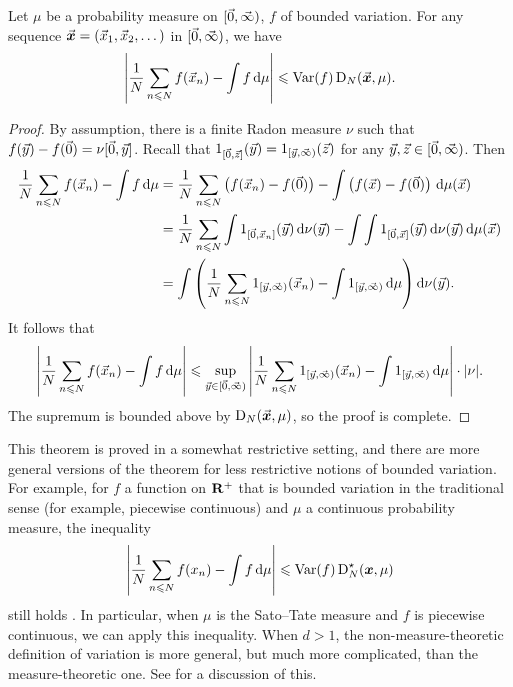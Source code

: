 \begin{theorem}\label{thm:koksma-hlawka}
Let $\mu$ be a probability measure on $[\vec{0},\vec{\infty})$, $f$ of bounded 
variation. For any sequence $\vec{\boldsymbol x} = (\vec{x}_1,\vec{x}_2,\dots)$ in $[\vec{0},\vec{\infty})$, 
we have 
\[
	\left| \frac{1}{N} \sum_{n\leqslant N} f(\vec{x}_n) - \int f\, \mathrm{d}\mu \right| \leqslant \operatorname{Var}(f) \operatorname{D}_N(\vec{\boldsymbol x},\mu) .
\]
\end{theorem}
\begin{proof}
By assumption, there is a finite Radon measure $\nu$ 
such that $f(\vec{y}) - f(\vec{0}) = \nu[\vec{0},\vec{y}]$. Recall that 
$1_{[\vec{0},\vec{z}]}(\vec{y}) = 1_{[\vec{y},\vec{\infty})}(\vec{z})$ for any 
$\vec{y},\vec{z}\in [\vec{0},\vec{\infty})$. Then 
\begin{align*}
	\frac{1}{N} \sum_{n\leqslant N} f(\vec{x}_n) - \int f\, \mathrm{d}\mu 
		&= \frac{1}{N} \sum_{n\leqslant N} \left(f(\vec{x}_n) - f(\vec{0})\right) - \int \left(f(\vec{x}) - f(\vec{0})\right)\, \mathrm{d}\mu(\vec{x}) \\
		&= \frac{1}{N} \sum_{n\leqslant N} \int 1_{[\vec{0},\vec{x}_n]}(\vec{y})\, \mathrm{d} \nu(\vec{y}) - \int \int 1_{[\vec{0},\vec{x}]}(\vec{y})\, \mathrm{d}\nu(\vec{y}) \, \mathrm{d}\mu(\vec{x}) \\
		&= \int \left(\frac{1}{N} \sum_{n\leqslant N} 1_{[\vec{y},\vec{\infty})}(\vec{x}_n) - \int 1_{[\vec{y},\vec{\infty})}\, \mathrm{d}\mu \right) \mathrm{d}\nu(\vec{y}) .
\end{align*}
It follows that 
\[
	\left| \frac{1}{N} \sum_{n\leqslant N} f(\vec{x}_n) - \int f\, \mathrm{d}\mu \right|
		\leqslant \sup_{\vec{y}\in [\vec{0},\vec{\infty})} \left| \frac{1}{N} \sum_{n\leqslant N} 1_{[\vec{y},\vec{\infty})}(\vec{x}_n) - \int 1_{[\vec{y},\vec{\infty})}\, \mathrm{d}\mu\right| \cdot |\nu| .
\]
The supremum is bounded above by $\operatorname{D}_N(\vec{\boldsymbol x},\mu)$, so the proof is complete. 
\end{proof}

This theorem is proved in a somewhat restrictive setting, and there are more 
general versions of the theorem for less restrictive notions of bounded 
variation. For example, for $f$ a function on $\mathbf{R}^+$ that is bounded variation 
in the traditional sense (for example, piecewise continuous) and $\mu$ a 
continuous probability measure, the inequality 
\[
	\left| \frac{1}{N} \sum_{n\leqslant N} f(x_n) - \int f\, \mathrm{d}\mu\right| \leqslant \operatorname{Var}(f) \operatorname{D}_N^\star({\boldsymbol x},\mu) 
\]
still holds \cite[Ch.~2, Th.~5.1]{kuipers-niederreiter-1974}. In particular, 
when $\mu$ is the Sato--Tate measure and $f$ is piecewise continuous, we can 
apply this inequality. When $d>1$, the non-measure-theoretic definition of 
variation is more general, but much more complicated, than the 
measure-theoretic one. See \cite[2\S5]{kuipers-niederreiter-1974} for a 
discussion of this. 





